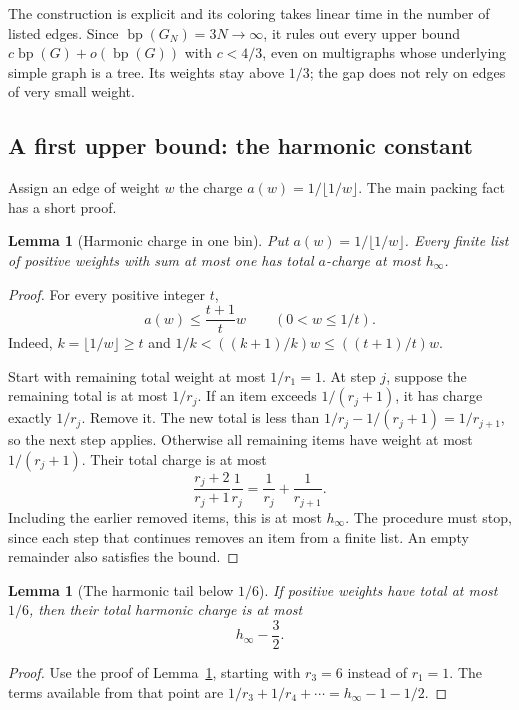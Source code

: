 \documentclass[11pt]{article}
\newtheorem{lemma}[theorem]{Lemma}
\theoremstyle{definition}\newtheorem{algorithm}{Algorithm}[section]
\numberwithin{equation}{section}
\theoremstyle{remark}\newtheorem*{remark}{Remark}
\newcommand{\bp}{\operatorname{bp}}
\begin{document}
The construction is explicit and its coloring takes linear time in the
number of listed edges. Since $\bp(G_N)=3N\to\infty$, it rules out
every upper bound $c\bp(G)+o(\bp(G))$ with $c<4/3$, even on
multigraphs whose underlying simple graph is a tree. Its weights stay
above $1/3$; the gap does not rely on edges of very small weight.

\subsection{A first upper bound: the harmonic constant}

Assign an edge of weight $w$ the charge $a(w)=1/\lfloor1/w\rfloor$.
The main packing fact has a short proof.

\begin{lemma}[Harmonic charge in one bin]\label{lem:general-bin-charge}
Put $a(w)=1/\lfloor1/w\rfloor$. Every finite list of positive weights
with sum at most one has total $a$-charge at most $h_\infty$.
\end{lemma}
\begin{proof}
For every positive integer $t$,
\[
 a(w)\le\frac{t+1}{t}w\qquad(0<w\le1/t).
\]
Indeed, $k=\lfloor1/w\rfloor\ge t$ and
$1/k<((k+1)/k)w\le((t+1)/t)w$.

Start with remaining total weight at most $1/r_1=1$. At step $j$,
suppose the remaining total is at most $1/r_j$. If an item exceeds
$1/(r_j+1)$, it has charge exactly $1/r_j$. Remove it. The new total
is less than $1/r_j-1/(r_j+1)=1/r_{j+1}$, so the next step applies.
Otherwise all remaining items have weight at most $1/(r_j+1)$.
Their total charge is at most
\[
 \frac{r_j+2}{r_j+1}\frac1{r_j}
 =\frac1{r_j}+\frac1{r_{j+1}}.
\]
Including the earlier removed items, this is at most $h_\infty$.
The procedure must stop, since each step that continues removes an
item from a finite list. An empty remainder also satisfies the bound.
\end{proof}

\begin{lemma}[The harmonic tail below $1/6$]
\label{lem:harmonic-tail-six}
If positive weights have total at most $1/6$, then their total harmonic
charge is at most
\[
 h_\infty-\frac32.
\]
\end{lemma}
\begin{proof}
Use the proof of Lemma~\ref{lem:general-bin-charge}, starting with
$r_3=6$ instead of $r_1=1$.  The terms available from that point are
$1/r_3+1/r_4+\cdots=h_\infty-1-1/2$.
\end{proof}
\end{document}
